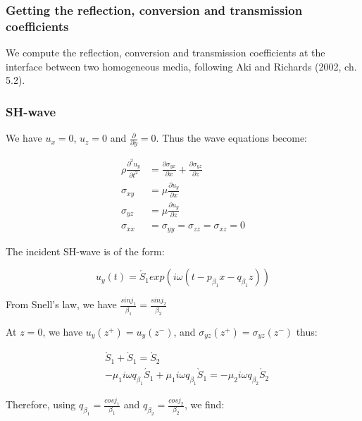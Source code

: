 \documentclass[main.tex]{subfiles}
\begin{document}
\subsubsection{Getting the reflection, conversion and transmission coefficients}

We compute the reflection, conversion and transmission coefficients at the interface between two homogeneous media, following Aki and Richards (2002, ch. 5.2).

\subsubsection{SH-wave}

We have $u_x = 0$, $u_z = 0$ and $\frac{\partial}{\partial y} = 0$. Thus the wave equations become:

\begin{equation}
\begin{split}
\rho \frac{\partial ^2 u_y}{\partial t^2} & = \frac{\partial \sigma_{yx}}{\partial x} + \frac{\partial \sigma_{yz}}{\partial z} \\
\sigma_{xy} & = \mu \frac{\partial u_y}{\partial x} \\
\sigma_{yz} & = \mu \frac{\partial u_y}{\partial z} \\
\sigma_{xx} & = \sigma_{yy} = \sigma_{zz} = \sigma_{xz} = 0
\end{split}
\end{equation}

The incident SH-wave is of the form:

\begin{equation}
u_y (t) = \acute S_1 exp (i \omega (t - p_{\beta_1} x - q_{\beta_1} z))
\end{equation}

From Snell's law, we have $\frac{sin j_1}{\beta_1} = \frac{sin j_2}{\beta_2}$

At $z = 0$, we have $u_y (z^+) = u_y (z^-)$, and $\sigma_{yz} (z^+) = \sigma_{yz} (z^-)$ thus:

\begin{equation}
\begin{split}
& \acute S_1 + \grave S_1 = \acute S_2 \\
& - \mu_1 i \omega q_{\beta_1} \acute S_1 + \mu_1 i \omega q_{\beta_1} \grave S_1 = - \mu_2 i \omega q_{\beta_2} \acute S_2
\end{split}
\end{equation}

Therefore, using $q_{\beta_1} = \frac{cos j_1}{\beta_1}$ and $q_{\beta_2} = \frac{cos j_2}{\beta_2}$, we find:
\end{document}
